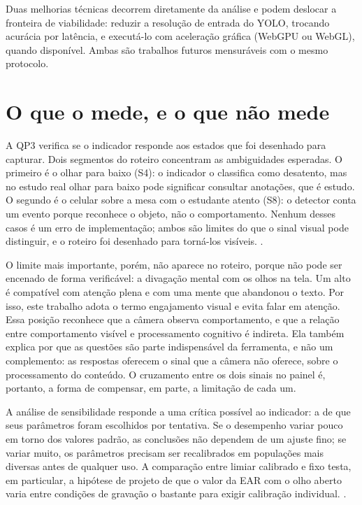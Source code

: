 Duas melhorias técnicas decorrem diretamente da análise e podem deslocar a fronteira de viabilidade: reduzir a resolução de entrada do YOLO, trocando acurácia por latência, e executá-lo com aceleração gráfica (WebGPU ou WebGL), quando disponível. Ambas são trabalhos futuros mensuráveis com o mesmo protocolo.

\section{O que o \fs mede, e o que não mede}

A QP3 verifica se o indicador responde aos estados que foi desenhado para capturar. Dois segmentos do roteiro concentram as ambiguidades esperadas. O primeiro é o olhar para baixo (S4): o indicador o classifica como desatento, mas no estudo real olhar para baixo pode significar consultar anotações, que é estudo. O segundo é o celular sobre a mesa com o estudante atento (S8): o detector conta um evento porque reconhece o objeto, não o comportamento. Nenhum desses casos é um erro de implementação; ambos são limites do que o sinal visual pode distinguir, e o roteiro foi desenhado para torná-los visíveis. .

O limite mais importante, porém, não aparece no roteiro, porque não pode ser encenado de forma verificável: a divagação mental com os olhos na tela. Um \fs alto é compatível com atenção plena e com uma mente que abandonou o texto. Por isso, este trabalho adota o termo engajamento visual e evita falar em atenção. Essa posição reconhece que a câmera observa comportamento, e que a relação entre comportamento visível e processamento cognitivo é indireta. Ela também explica por que as questões são parte indispensável da ferramenta, e não um complemento: as respostas oferecem o sinal que a câmera não oferece, sobre o processamento do conteúdo. O cruzamento entre os dois sinais no painel é, portanto, a forma de compensar, em parte, a limitação de cada um.

A análise de sensibilidade responde a uma crítica possível ao indicador: a de que seus parâmetros foram escolhidos por tentativa. Se o desempenho variar pouco em torno dos valores padrão, as conclusões não dependem de um ajuste fino; se variar muito, os parâmetros precisam ser recalibrados em populações mais diversas antes de qualquer uso. A comparação entre limiar calibrado e fixo testa, em particular, a hipótese de projeto de que o valor da EAR com o olho aberto varia entre condições de gravação o bastante para exigir calibração individual. .

